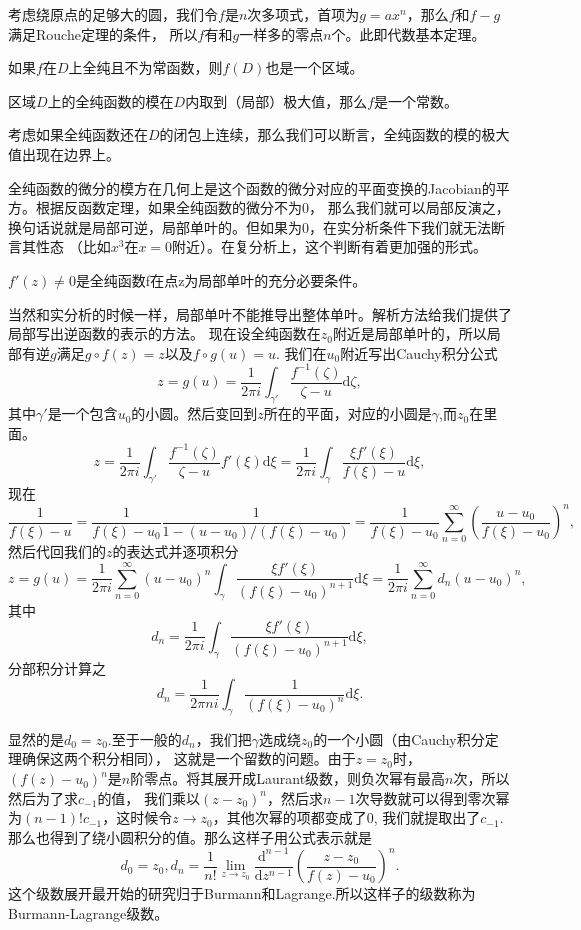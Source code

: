 考虑绕原点的足够大的圆，我们令$f$是$n$次多项式，首项为$g=ax^n$，那么$f$和$f-g$满足Rouche定理的条件，
所以$f$有和$g$一样多的零点$n$个。此即代数基本定理。
\begin{pro}[保区域原理]
    如果$f$在$D$上全纯且不为常函数，则$f(D)$也是一个区域。
\end{pro}
\begin{pro}[最大模原理]
    区域$D$上的全纯函数的模在$D$内取到（局部）极大值，那么$f$是一个常数。
\end{pro}
考虑如果全纯函数还在$D$的闭包上连续，那么我们可以断言，全纯函数的模的极大值出现在边界上。

全纯函数的微分的模方在几何上是这个函数的微分对应的平面变换的Jacobian的平方。根据反函数定理，如果全纯函数的微分不为0，
那么我们就可以局部反演之，换句话说就是局部可逆，局部单叶的。但如果为0，在实分析条件下我们就无法断言其性态
（比如$x^3$在$x=0$附近）。在复分析上，这个判断有着更加强的形式。
\begin{pro}
$f'(z)\neq 0$是全纯函数f在点z为局部单叶的充分必要条件。
\end{pro}
当然和实分析的时候一样，局部单叶不能推导出整体单叶。解析方法给我们提供了局部写出逆函数的表示的方法。
现在设全纯函数在$z_0$附近是局部单叶的，所以局部有逆$g$满足$g\circ f (z) =z$以及$f\circ g (u) =u$.
我们在$u_0$附近写出Cauchy积分公式
\[
z=g(u)=\frac{1}{2\pi i}\int_{\gamma'} \frac{f^{-1}(\zeta)}{\zeta-u}\mathrm{d}\zeta,
\]
其中$\gamma'$是一个包含$u_0$的小圆。然后变回到$z$所在的平面，对应的小圆是$\gamma$,而$z_0$在里面。
\[z=\frac{1}{2\pi i}\int_{\gamma'} \frac{f^{-1}(\zeta)}{\zeta-u}f'(\xi)\mathrm{d}\xi=\frac{1}{2\pi i}\int_\gamma
\frac{\xi f'(\xi)}{f(\xi)-u}\mathrm{d}\xi,\]
现在
\[\frac{1}{f(\xi)-u}=\frac{1}{f(\xi)-u_0}\frac{1}{1-(u-u_0)/(f(\xi)-u_0)}=\frac{1}{f(\xi)-u_0}\sum_{n=0}^\infty
\left(\frac{u-u_0}{f(\xi)-u_0}\right)^n,\]
然后代回我们的$z$的表达式并逐项积分
\[z=g(u)=\frac{1}{2\pi i}\sum_{n=0}^\infty (u-u_0)^n\int_\gamma \frac{\xi f'(\xi)}{\left(f(\xi)-u_0\right)^{n+1}}
\mathrm{d}\xi=\frac{1}{2\pi i}\sum_{n=0}^\infty d_n(u-u_0)^n,\]
其中\[d_n=\frac{1}{2\pi i}\int_\gamma \frac{\xi f'(\xi)}{\left(f(\xi)-u_0\right)^{n+1}}\mathrm{d}\xi,\]分部积分计算之
\[d_n=\frac{1}{2\pi ni}\int_\gamma \frac{1}{\left(f(\xi)-u_0\right)^n}\mathrm{d}\xi.\]

显然的是$d_0=z_0$.至于一般的$d_n$，我们把$\gamma$选成绕$z_0$的一个小圆（由Cauchy积分定理确保这两个积分相同），
这就是一个留数的问题。由于$z=z_0$时，
$\left(f(z)-u_0\right)^n$是$n$阶零点。将其展开成Laurant级数，则负次幂有最高$n$次，所以然后为了求$c_{-1}$的值，
我们乘以$(z-z_0)^n$，然后求$n-1$次导数就可以得到零次幂为$(n-1)!c_{-1}$，这时候令$z\to z_0$，其他次幂的项都变成了0,
我们就提取出了$c_{-1}$. 那么也得到了绕小圆积分的值。那么这样子用公式表示就是
\[
d_0=z_0,d_n=\frac{1}{n!}\lim_{z\to z_0}\frac{\mathrm{d}^{n-1}}{\mathrm{d}z^{n-1}}\left(\frac{z-z_0}{f(z)-u_0}
\right)^n.
\]
这个级数展开最开始的研究归于Burmann和Lagrange.所以这样子的级数称为Burmann-Lagrange级数。

